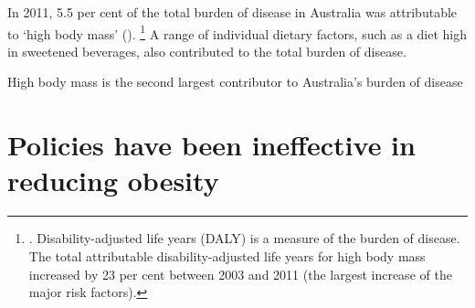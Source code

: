 \documentclass[embargoed]{grattan}
\begin{document}
In 2011, 5.5 per cent of the total burden of disease in Australia was attributable to `high body mass' ().%
\footnote{\textcite[][Table~6.1]{Health2016AustralianBurdenDisease}.
Disability-adjusted life years (DALY) is a measure of the burden of disease.
The total attributable disability-adjusted life years for high body mass increased by 23 per cent between 2003 and 2011 (the largest increase of the major risk factors).} A range of individual dietary factors, such as a diet high in sweetened beverages, also contributed to the total burden of disease.

\begin{table}
\caption{High body mass is the second largest contributor to Australia's burden of disease} \label{tbl:high-body-is-the-2nd-largest-contributor-to-Aust-disease-burden}




\end{table}

\section{Policies have been ineffective in reducing obesity}\label{policies-have-been-ineffective-in-reducing-obesity}
\end{document}
